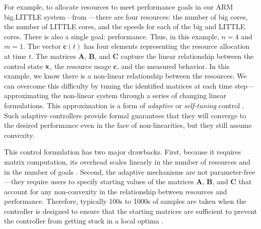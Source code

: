 For example, to allocate resources to meet performance goals in our
ARM big.LITTLE system---from ---there are four
resources: the number of big cores, the number of LITTLE cores, and
the speeds for each of the big and LITTLE cores.  There is also a
single goal: performance.  Thus, in this example, $n=4$ and $m=1$. The
vector $\mathbf{c}(t)$ has four elements representing the resource
allocation at time $t$.  The matrices $\mathbf{A}$, $\mathbf{B}$, and
$\mathbf{C}$ capture the linear relationship between the control state
$\mathbf{x}$, the resource usage $\mathbf{c}$, and the measured behavior.  In
this example, we know there is a non-linear relationship between the
resources.  We can overcome this difficulty by tuning the identified
matrices at each time step---approximating the non-linear system
through a series of changing linear formulations.  This approximation
is a form of \emph{adaptive} or \emph{self-tuning} control
\cite{AdaptiveControl}.  Such adaptive controllers provide formal
guarantees that they will converge to the desired performance even in
the face of non-linearities, but they still assume convexity.

This control formulation has two major drawbacks.  First, because it
requires matrix computation, its overhead scales linearly in the
number of resources and in the number of goals
\cite{Hellerstein2004a,METE}.  Second, the adaptive mechanisms are not
parameter-free---they require users to specify starting values of the
matrices $\mathbf{A}$, $\mathbf{B}$, and $\mathbf{C}$ that account for
any non-convexity in the relationship between resources and
performance\cite{POET,METE,ControlWare,AdaptiveControl}.  Therefore,
typically 100s to 1000s of samples are taken when the controller is
designed to ensure that the starting matrices are sufficient to
prevent the controller from getting stuck in a local optima
\cite{FSE2015,sysid,josep-isca2016}.  

